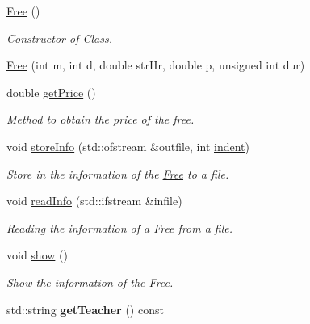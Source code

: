 \begin{DoxyCompactItemize}
\item 
\mbox{\label{class_free_a4a847fee0a934284fc4581282706e885}} 
\mbox{\hyperlink{class_free_a4a847fee0a934284fc4581282706e885}{Free}} ()
\begin{DoxyCompactList}\small\item\em Constructor of Class. \end{DoxyCompactList}\item 
\mbox{\hyperlink{class_free_afe1bb925d237595d9fd75fb2e7772314}{Free}} (int m, int d, double str\+Hr, double p, unsigned int dur)
\item 
double \mbox{\hyperlink{class_free_a229f009a7535eeba0a6ff4495de8c6bf}{get\+Price}} ()
\begin{DoxyCompactList}\small\item\em Method to obtain the price of the free. \end{DoxyCompactList}\item 
void \mbox{\hyperlink{class_free_a5eec9da16ebf4f388d16dd270bd93b64}{store\+Info}} (std\+::ofstream \&outfile, int \mbox{\hyperlink{class_reservation_a480981ed050bae19bc74bbb0bbb459f9}{indent}})
\begin{DoxyCompactList}\small\item\em Store in the information of the \mbox{\hyperlink{class_free}{Free}} to a file. \end{DoxyCompactList}\item 
void \mbox{\hyperlink{class_free_ad1023c825c9790edf0797e2e69dd2fcf}{read\+Info}} (std\+::ifstream \&infile)
\begin{DoxyCompactList}\small\item\em Reading the information of a \mbox{\hyperlink{class_free}{Free}} from a file. \end{DoxyCompactList}\item 
\mbox{\label{class_free_acdd5db6cb64932312fc5e096265ebffa}} 
void \mbox{\hyperlink{class_free_acdd5db6cb64932312fc5e096265ebffa}{show}} ()
\begin{DoxyCompactList}\small\item\em Show the information of the \mbox{\hyperlink{class_free}{Free}}. \end{DoxyCompactList}\item 
\mbox{\label{class_free_a785a58afc51a7b1920e7b2a96ff9ca52}} 
std\+::string {\bfseries get\+Teacher} () const
\end{DoxyCompactItemize}
